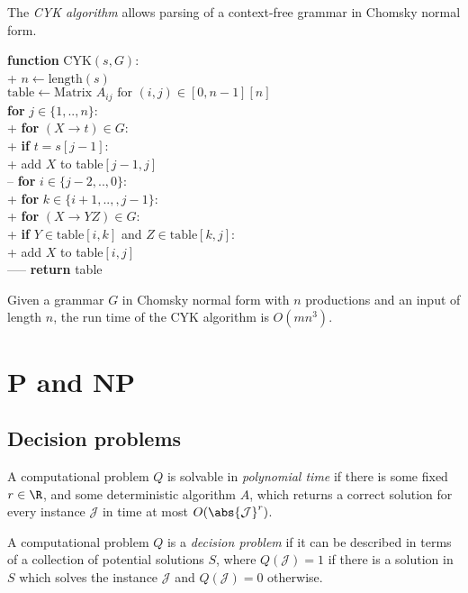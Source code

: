 \documentclass{article}
\begin{document}
\begin{definition}
	The \emph{CYK algorithm} allows parsing of a context-free
	grammar in Chomsky normal form.
	\begin{pseudo}
		\textbf{function} \textsf{CYK}$(s,G)$:\\+
			$n\leftarrow\text{length}(s)$\\
			$\text{table}\leftarrow\text{Matrix }A_{ij}\text{ for }(i,j)\in[0,n-1][n]$\\
			\textbf{for} $j\in\{1,..,n\}$:\\+
				\textbf{for} $(X\to t)\in G$:\\+
					\textbf{if} $t=s[j-1]$:\\+
						add $X$ to table$[j-1,j]$\\--
				\textbf{for} $i\in\{j-2,..,0\}$:\\+
					\textbf{for} $k\in\{i+1,..,,j-1\}$:\\+
						\textbf{for} $(X\to YZ)\in G$:\\+
							\textbf{if} $Y\in\text{table}[i,k]$ and $Z\in\text{table}[k,j]$:\\+
								add $X$ to table$[i,j]$\\-----
            \textbf{return} table
    \end{pseudo}
\end{definition}

\begin{theorem}
	Given a grammar $G$ in Chomsky normal form with $n$ 
	productions and an input of length $n$, the run time
	of the CYK algorithm is $O(mn^3)$.
\end{theorem}

\section{P and NP}

\subsection{Decision problems}

\begin{definition}
	A computational problem $Q$ is solvable in \emph{polynomial
	time} if there is some fixed $r\in\R$, and some deterministic
	algorithm $A$, which returns a correct solution for every
	instance $\mathcal{J}$ in time at most $O(\abs{\mathcal{J}}^r)$.
\end{definition}

\begin{definition}
	A computational problem $Q$ is a \emph{decision problem} if
	it can be described in terms of a collection of potential
	solutions $S$, where $Q(\mathcal{J})=1$ if there is a solution
	in $S$ which solves the instance $\mathcal{J}$ and $Q(\mathcal{J})=0$
	otherwise.
\end{definition}
\end{document}

